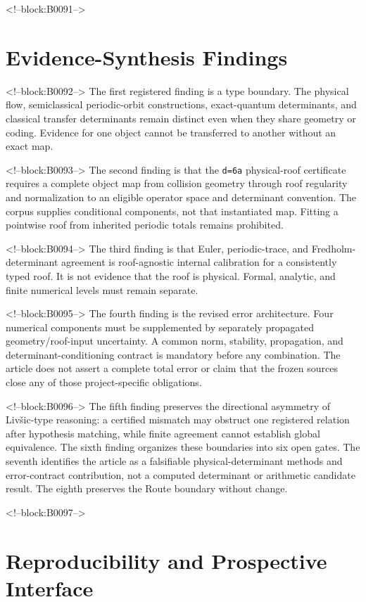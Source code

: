 \documentclass[11pt,a4paper]{article}
\begin{document}
<!--block:B0091-->
\section{Evidence-Synthesis Findings}

<!--block:B0092-->
The first registered finding is a type boundary. The physical flow, semiclassical periodic-orbit constructions, exact-quantum determinants, and classical transfer determinants remain distinct even when they share geometry or coding. Evidence for one object cannot be transferred to another without an exact map.

<!--block:B0093-->
The second finding is that the \texttt{d=6a} physical-roof certificate requires a complete object map from collision geometry through roof regularity and normalization to an eligible operator space and determinant convention. The corpus supplies conditional components, not that instantiated map. Fitting a pointwise roof from inherited periodic totals remains prohibited.

<!--block:B0094-->
The third finding is that Euler, periodic-trace, and Fredholm-determinant agreement is roof-agnostic internal calibration for a consistently typed roof. It is not evidence that the roof is physical. Formal, analytic, and finite numerical levels must remain separate.

<!--block:B0095-->
The fourth finding is the revised error architecture. Four numerical components must be supplemented by separately propagated geometry/roof-input uncertainty. A common norm, stability, propagation, and determinant-conditioning contract is mandatory before any combination. The article does not assert a complete total error or claim that the frozen sources close any of those project-specific obligations.

<!--block:B0096-->
The fifth finding preserves the directional asymmetry of Livšic-type reasoning: a certified mismatch may obstruct one registered relation after hypothesis matching, while finite agreement cannot establish global equivalence. The sixth finding organizes these boundaries into six open gates. The seventh identifies the article as a falsifiable physical-determinant methods and error-contract contribution, not a computed determinant or arithmetic candidate result. The eighth preserves the Route boundary without change.

<!--block:B0097-->
\section{Reproducibility and Prospective Interface}
\end{document}

